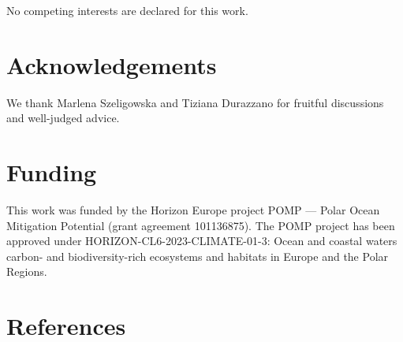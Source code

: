 \documentclass[
  letterpaper,
  DIV=11,
  numbers=noendperiod]{scrartcl}
\begin{document}
No competing interests are declared for this work.

\section{Acknowledgements}\label{acknowledgements}

We thank Marlena Szeligowska and Tiziana Durazzano for fruitful
discussions and well-judged advice.

\section{Funding}\label{funding}

This work was funded by the Horizon Europe project POMP --- Polar Ocean
Mitigation Potential (grant agreement 101136875). The POMP project has
been approved under HORIZON-CL6-2023-CLIMATE-01-3: Ocean and coastal
waters carbon- and biodiversity-rich ecosystems and habitats in Europe
and the Polar Regions.

\section*{References}\label{references}
\end{document}
